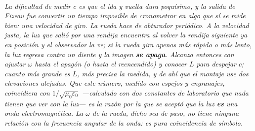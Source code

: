 \begin{center}
\begin{tikzpicture}[scale=0.95, transform shape]
\end{tikzpicture}\\[0.5em]
{\small\itshape La dificultad de medir $c$ es que el ida y vuelta dura
poquísimo, y la salida de Fizeau fue convertir un tiempo imposible de cronometrar
en algo que sí se mide bien: una velocidad de giro. La rueda hace de obturador
periódico. A la velocidad justa, la luz que salió por una rendija encuentra al
volver la rendija siguiente ya en posición y el observador la ve; si la rueda
gira apenas más rápido o más lento, la luz regresa contra un diente y la imagen
\textbf{se apaga}. Alcanza entonces con ajustar $\omega$ hasta el apagón (o hasta
el reencendido) y conocer $L$ para despejar $c$; cuanto más grande es $L$, más
precisa la medida, y de ahí que el montaje use dos elevaciones alejadas. Que este
número, medido con espejos y engranajes, coincidiera con
$1/\sqrt{\mu_0\varepsilon_0}$ ---calculado con dos constantes de laboratorio que
nada tienen que ver con la luz--- es la razón por la que se aceptó que la luz
\textbf{es} una onda electromagnética. La $\omega$ de la rueda, dicho sea de
paso, no tiene ninguna relación con la frecuencia angular de la onda: es pura
coincidencia de símbolo.}
\end{center}
